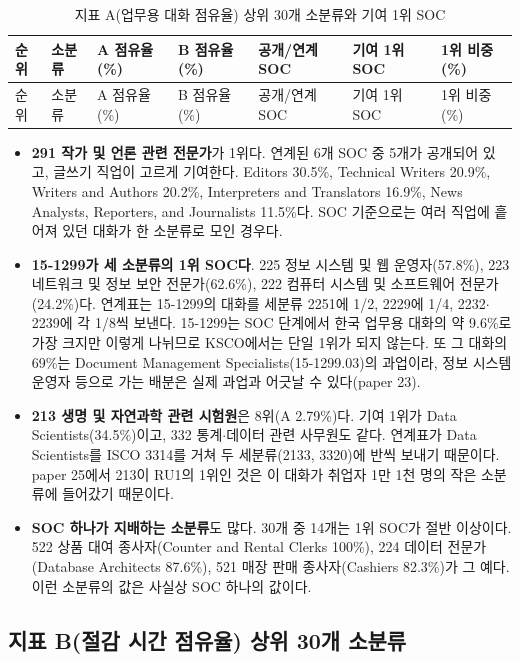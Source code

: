 \documentclass[11pt]{article}
\begin{document}
\begin{longtable}{R{0.6cm}L{4.3cm}R{1.3cm}R{1.0cm}R{1.1cm}L{5.2cm}R{1.0cm}}
\caption{지표 A(업무용 대화 점유율) 상위 30개 소분류와 기여 1위 SOC}\label{tab:conv}\\
\toprule
순위 & 소분류 & A 점유율(\%) & B 점유율(\%) & 공개/연계 SOC & 기여 1위 SOC & 1위 비중(\%) \\
\midrule
\endfirsthead
\toprule
순위 & 소분류 & A 점유율(\%) & B 점유율(\%) & 공개/연계 SOC & 기여 1위 SOC & 1위 비중(\%) \\
\midrule
\endhead

\bottomrule
\end{longtable}

\begin{itemize}[leftmargin=*]
  \item \textbf{291 작가 및 언론 관련 전문가}가 1위다. 연계된 6개 SOC 중 5개가 공개되어 있고, 글쓰기 직업이 고르게 기여한다. Editors 30.5\%, Technical Writers 20.9\%, Writers and Authors 20.2\%, Interpreters and Translators 16.9\%, News Analysts, Reporters, and Journalists 11.5\%다. SOC 기준으로는 여러 직업에 흩어져 있던 대화가 한 소분류로 모인 경우다.
  \item \textbf{15-1299가 세 소분류의 1위 SOC다}. 225 정보 시스템 및 웹 운영자(57.8\%), 223 네트워크 및 정보 보안 전문가(62.6\%), 222 컴퓨터 시스템 및 소프트웨어 전문가(24.2\%)다. 연계표는 15-1299의 대화를 세분류 2251에 1/2, 2229에 1/4, 2232$\cdot$2239에 각 1/8씩 보낸다. 15-1299는 SOC 단계에서 한국 업무용 대화의 약 9.6\%로 가장 크지만 이렇게 나뉘므로 KSCO에서는 단일 1위가 되지 않는다. 또 그 대화의 69\%는 Document Management Specialists(15-1299.03)의 과업이라, 정보 시스템 운영자 등으로 가는 배분은 실제 과업과 어긋날 수 있다(paper 23).
  \item \textbf{213 생명 및 자연과학 관련 시험원}은 8위(A 2.79\%)다. 기여 1위가 Data Scientists(34.5\%)이고, 332 통계$\cdot$데이터 관련 사무원도 같다. 연계표가 Data Scientists를 ISCO 3314를 거쳐 두 세분류(2133, 3320)에 반씩 보내기 때문이다. paper 25에서 213이 RU1의 1위인 것은 이 대화가 취업자 1만 1천 명의 작은 소분류에 들어갔기 때문이다.
  \item \textbf{SOC 하나가 지배하는 소분류}도 많다. 30개 중 14개는 1위 SOC가 절반 이상이다. 522 상품 대여 종사자(Counter and Rental Clerks 100\%), 224 데이터 전문가(Database Architects 87.6\%), 521 매장 판매 종사자(Cashiers 82.3\%)가 그 예다. 이런 소분류의 값은 사실상 SOC 하나의 값이다.
\end{itemize}

\subsection{지표 B(절감 시간 점유율) 상위 30개 소분류}
\end{document}
